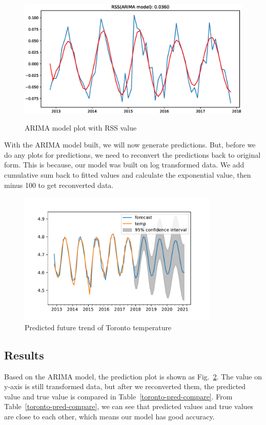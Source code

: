 \documentclass[runningheads]{llncs}
\begin{document}
\begin{figure}
    \centering
    \includegraphics[height=2.5in]{Toronto-ARIMAmodel.eps}
    \caption{ARIMA model plot with RSS value}\label{toronto-arima}
\end{figure}

With the ARIMA model built, we will now generate predictions. But, before we do any plots for predictions, we need to reconvert the predictions back to original form. This is because, our model was built on log transformed data. We add cumulative sum back to fitted values and calculate the exponential value, then minus 100 to get reconverted data.

\begin{figure}
    \centering
    \includegraphics[height=2.5in]{Toronto-pred.pdf}
    \caption{Predicted future trend of Toronto temperature}\label{toronto-pred}
\end{figure}

\subsection{Results}

Based on the ARIMA model, the prediction plot is shown as Fig.~\ref{toronto-pred}. The value on y-axis is still transformed data, but after we reconverted them, the predicted value and true value is compared in Table~\ref{toronto-pred-compare}. From Table~\ref{toronto-pred-compare}, we can see that predicted values and true values are close to each other, which means our model has good accuracy.
\end{document}
